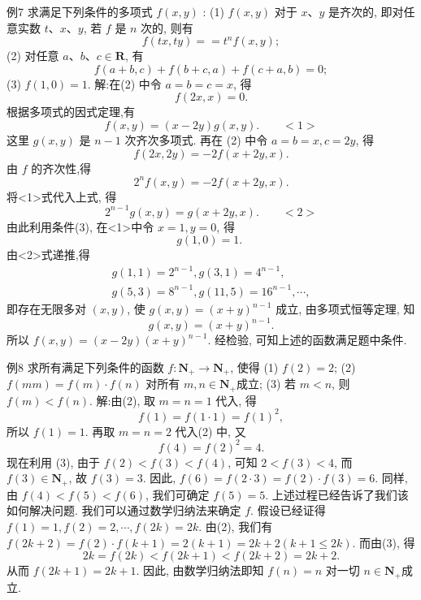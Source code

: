 例7 求满足下列条件的多项式 $f(x, y)$ :
(1) $f(x, y)$ 对于 $x 、 y$ 是齐次的, 即对任意实数 $t 、 x 、 y$, 若 $f$ 是 $n$ 次的, 则有
$$
f(t x, t y)==t^n f(x, y) ;
$$
(2) 对任意 $a 、 b 、 c \in \mathbf{R}$, 有
$$
f(a+b, c)+f(b+c, a)+f(c+a, b)=0 ;
$$
(3) $f(1,0)=1$.
解:在(2) 中令 $a=b=c=x$, 得
$$
f(2 x, x)=0 .
$$
根据多项式的因式定理,有
$$
f(x, y)=(x-2 y) g(x, y) . \quad\quad <1>
$$
这里 $g(x, y)$ 是 $n-1$ 次齐次多项式.
再在 (2) 中令 $a=b=x, c=2 y$, 得
$$
f(2 x, 2 y)=-2 f(x+2 y, x) .
$$
由 $f$ 的齐次性,得
$$
2^n f(x, y)=-2 f(x+2 y, x) .
$$
将<1>式代入上式, 得
$$
2^{n-1} g(x, y)=g(x+2 y, x) . \quad\quad <2>
$$
由此利用条件(3), 在<1>中令 $x=1, y=0$, 得
$$
g(1,0)=1 \text {. }
$$
由<2>式递推,得
$$
\begin{gathered}
g(1,1)=2^{n-1}, g(3,1)=4^{n-1}, \\
g(5,3)=8^{n-1}, g(11,5)=16^{n-1}, \cdots,
\end{gathered}
$$
即存在无限多对 $(x, y)$, 使 $g(x, y)=(x+y)^{n-1}$ 成立, 由多项式恒等定理, 知
$$
g(x, y)=(x+y)^{n-1} .
$$
所以 $f(x, y)=(x-2 y)(x+y)^{n-1}$.
经检验, 可知上述的函数满足题中条件.



例8 求所有满足下列条件的函数 $f: \mathbf{N}_{+} \rightarrow \mathbf{N}_{+}$, 使得
(1) $f(2)=2$;
(2) $f(m m)=f(m) \cdot f(n)$ 对所有 $m, n \in \mathbf{N}_{+}$成立;
(3) 若 $m<n$, 则 $f(m)<f(n)$.
解:由(2), 取 $m=n=1$ 代入, 得
$$
f(1)=f(1 \cdot 1)=f(1)^2,
$$
所以 $f(1)=1$.
再取 $m=n=2$ 代入(2) 中, 又
$$
f(4)=f(2)^2=4 .
$$
现在利用 (3), 由于 $f(2)<f(3)<f(4)$, 可知 $2<f(3)<4$, 而 $f(3) \in\mathbf{N}_{+}$, 故 $f(3)=3$.
因此, $f(6)=f(2 \cdot 3)=f(2) \cdot f(3)=6$.
同样, 由 $f(4)<f(5)<f(6)$, 我们可确定 $f(5)=5$.
上述过程已经告诉了我们该如何解决问题.
我们可以通过数学归纳法来确定 $f$.
假设已经证得 $f(1)=1, f(2)=2, \cdots, f(2 k)=2 k$.
由(2), 我们有
$f(2 k+2)=f(2) \cdot f(k+1)=2(k+1)=2 k+2(k+1 \leqslant 2 k)$.
而由(3), 得
$$
2 k=f(2 k)<f(2 k+1)<f(2 k+2)=2 k+2 .
$$
从而 $f(2 k+1)=2 k+1$.
因此, 由数学归纳法即知 $f(n)=n$ 对一切 $n \in \mathbf{N}_{+}$成立.



